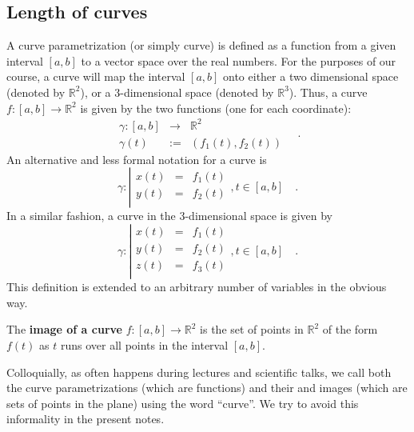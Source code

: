 \documentclass[12pt]{book}
\newcommand{\eqdef}{\textbf{:=}}
\renewcommand{\emph}{\textbf}
\begin{document}
\subsection{Length of curves} \label{secCurveLength}
 A curve parametrization (or simply curve) is defined as a function from a given interval $[a,b]$ to a vector space over the real numbers. For the purposes of our course, a curve will map the interval $[a,b]$ onto either a two dimensional space (denoted by $\mathbb R^2$), or a 3-dimensional space (denoted by $\mathbb R^3$). Thus, a curve $f:[a,b]\to \mathbb R^2$ is given by the two functions (one for each coordinate):
\[
\begin{array}{rcl}
\gamma:[a,b]&\to& \mathbb R^2\\
\gamma(t)&\eqdef& (f_1(t), f_2(t))
\end{array}\quad .
\]
An alternative and less formal notation for a curve is
\[
\gamma:\left| 
\begin{array}{rcl}
x(t)&=&f_1(t)\\
y(t)&=&f_2(t)\\
\end{array}\right., t\in [a,b]\quad .
\]
In a similar fashion, a curve in the 3-dimensional space is given by 
\[
\gamma:\left| 
\begin{array}{rcl}
x(t)&=&f_1(t)\\
y(t)&=&f_2(t)\\
z(t)&=&f_3(t)\\
\end{array}\right., t\in [a,b]\quad .
\]
This definition is extended to an arbitrary number of variables in the obvious way.

The \emph{image of a curve} $f:[a,b]\to \mathbb R^2$ is the set of points in $\mathbb R^2$ of the form $f(t)$ as $t$ runs over all points in the interval $[a,b]$.

Colloquially, as often happens during lectures and scientific talks, we call both the curve parametrizations (which are functions) and their  and images (which are sets of points in the plane) using the word ``curve''. We try to avoid this informality in the present notes.
\end{document}
